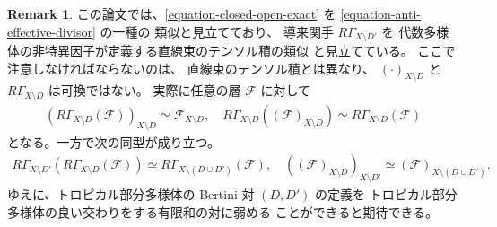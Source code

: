 \documentclass[a4paper,dvipdfmx,reqno,12pt]{amsart}
\theoremstyle{definition}
\newtheorem{remark}[theorem]{Remark}
\newcommand{\deq}{\coloneqq}
\numberwithin{equation}{section}
\begin{document}
\begin{remark}
この論文では、\eqref{equation-closed-open-exact} を
\eqref{equation-anti-effective-divisor} の一種の
類似と見立てており、
導来関手 $R\Gamma_{X\setminus D'}$ を
代数多様体の非特異因子が定義する直線束のテンソル積の類似
と見立てている。
ここで注意しなければならないのは、
直線束のテンソル積とは異なり、
$(\cdot )_{X\setminus D}$
と $R\Gamma_{X\setminus D}$ は可換ではない。
実際に任意の層 $\mathcal{F}$ に対して
\begin{align}
(R\Gamma_{X\setminus D}(\mathcal{F}))_{X\setminus D}
\simeq 
\mathcal{F}_{X\setminus D}, \quad
R\Gamma_{X\setminus D}((\mathcal{F})_{X\setminus D})
\simeq R\Gamma_{X\setminus D}(\mathcal{F})
\end{align}
となる。一方で次の同型が成り立つ。
\begin{align}
R\Gamma_{X\setminus D'}
(R\Gamma_{X\setminus D}(\mathcal{F}))
\simeq R\Gamma_{X\setminus (D\cup D')}(\mathcal{F}), \quad
((\mathcal{F})_{X\setminus D})_{X\setminus D'}
\simeq (\mathcal{F})_{X\setminus (D \cup D')}.
\end{align}
ゆえに、トロピカル部分多様体の Bertini 対 $(D,D')$ の定義を
トロピカル部分多様体の良い交わりをする有限和の対に弱める
ことができると期待できる。

\end{remark}

\end{document}
